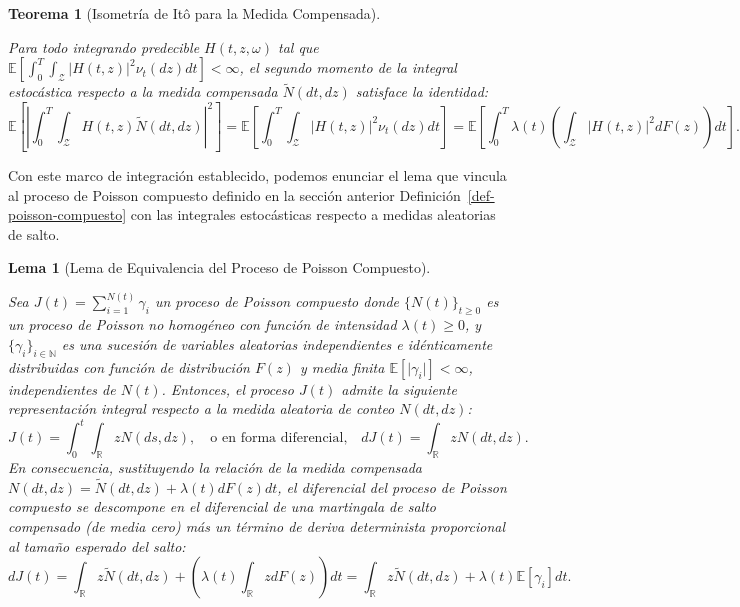 \documentclass[
  spanish,
  us-letterpaper,
]{scrreprt}
\numberwithin{equation}{section}
\theoremstyle{plain}
\newtheorem{theorem}{Teorema}[chapter]
\theoremstyle{plain}
\newtheorem{lemma}{Lema}[chapter]
\theoremstyle{plain}
\theoremstyle{definition}
\theoremstyle{remark}
\begin{document}
\begin{theorem}[Isometría de Itô para la Medida
Compensada]\protect\hypertarget{thm-isometria-saltos}{}\label{thm-isometria-saltos}

Para todo integrando predecible \(H(t, z, \omega)\) tal que
\(\mathbb{E} \left[ \displaystyle \int_0^T \int_{\mathcal{Z}} \vert H(t, z) \vert^2 \nu_t(dz) dt \right] < \infty\),
el segundo momento de la integral estocástica respecto a la medida
compensada \(\tilde{N}(dt, dz)\) satisface la identidad: \[
\mathbb{E}\left[ \left\vert \int_0^T \int_{\mathcal{Z}} H(t, z) \tilde{N}(dt, dz) \right\vert^2 \right] = \mathbb{E}\left[ \int_0^T \int_{\mathcal{Z}} \vert H(t, z) \vert^2 \nu_t(dz) dt \right] = \mathbb{E}\left[ \int_0^T \lambda(t) \left( \int_{\mathcal{Z}} \vert H(t, z) \vert^2 dF(z) \right) dt \right].
\]

\end{theorem}

Con este marco de integración establecido, podemos enunciar el lema que
vincula al proceso de Poisson compuesto definido en la sección anterior
Definición~\ref{def-poisson-compuesto} con las integrales estocásticas
respecto a medidas aleatorias de salto.

\begin{lemma}[Lema de Equivalencia del Proceso de Poisson
Compuesto]\protect\hypertarget{lem-equivalencia-saltos}{}\label{lem-equivalencia-saltos}

Sea \(\displaystyle J(t) = \sum_{i=1}^{N(t)} \gamma_i\) un proceso de
Poisson compuesto donde \(\displaystyle \{N(t)\}_{t \ge 0}\) es un
proceso de Poisson no homogéneo con función de intensidad
\(\lambda(t) \ge 0\), y \(\{\gamma_i\}_{i \in \mathbb{N}}\) es una
sucesión de variables aleatorias independientes e idénticamente
distribuidas con función de distribución \(F(z)\) y media finita
\(\mathbb{E}[\vert \gamma_i \vert] < \infty\), independientes de
\(N(t)\). Entonces, el proceso \(J(t)\) admite la siguiente
representación integral respecto a la medida aleatoria de conteo
\(N(dt, dz)\): \[
J(t) = \int_0^t \int_{\mathbb{R}} z N(ds, dz), \quad \text{o en forma diferencial,} \quad dJ(t) = \int_{\mathbb{R}} z N(dt, dz).
\] En consecuencia, sustituyendo la relación de la medida compensada
\(N(dt, dz) = \tilde{N}(dt, dz) + \lambda(t)dF(z)dt\), el diferencial
del proceso de Poisson compuesto se descompone en el diferencial de una
martingala de salto compensado (de media cero) más un término de deriva
determinista proporcional al tamaño esperado del salto: \[
dJ(t) = \int_{\mathbb{R}} z \tilde{N}(dt, dz) + \left( \lambda(t) \int_{\mathbb{R}} z dF(z) \right) dt = \int_{\mathbb{R}} z \tilde{N}(dt, dz) + \lambda(t) \mathbb{E}[\gamma_i] dt.
\]

\end{lemma}
\end{document}
